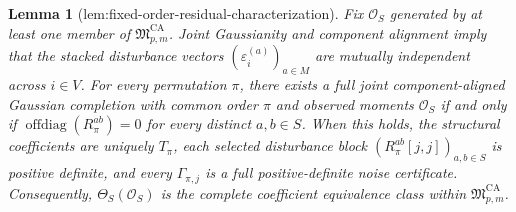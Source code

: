 \documentclass{article}
\newtheorem{lemma}{Lemma}
\begin{document}
\begin{lemma}[lem:fixed-order-residual-characterization]\label{lem:fixed-order-residual-characterization}
Fix \(\mathcal O_S\) generated by at least one member of \(\mathfrak M_{p,m}^{\mathrm{CA}}\). Joint Gaussianity and component alignment imply that the stacked disturbance vectors \((\varepsilon_i^{(a)})_{a\in M}\) are mutually independent across \(i\in V\). For every permutation \(\pi\), there exists a full joint component-aligned Gaussian completion with common order \(\pi\) and observed moments \(\mathcal O_S\) if and only if \(\operatorname{offdiag}(R_\pi^{ab})=0\) for every distinct \(a,b\in S\). When this holds, the structural coefficients are uniquely \(T_\pi\), each selected disturbance block \((R_\pi^{ab}[j,j])_{a,b\in S}\) is positive definite, and every \(\Gamma_{\pi,j}\) is a full positive-definite noise certificate. Consequently, \(\Theta_S(\mathcal O_S)\) is the complete coefficient equivalence class within \(\mathfrak M_{p,m}^{\mathrm{CA}}\).
\end{lemma}
\end{document}
